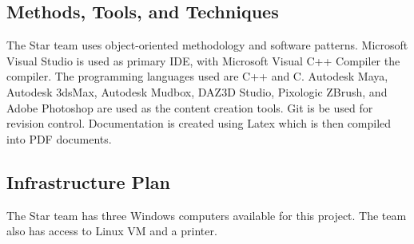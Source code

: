 \documentclass[12pt,letterpaper]{article}
\begin{document}
	\subsection[Methods, Tools, and Techniques]{Methods, Tools, and Techniques}
	The Star team uses object-oriented methodology and software patterns. Microsoft Visual Studio is used as primary IDE, with Microsoft Visual C++ Compiler the compiler. The programming languages used are C++ and C. Autodesk Maya, Autodesk 3dsMax, Autodesk Mudbox, DAZ3D Studio, Pixologic ZBrush, and Adobe Photoshop are used as the content creation tools. Git is be used for revision control. Documentation is created using Latex which is then compiled into PDF documents.

	\subsection{Infrastructure Plan}
	The Star team has three Windows computers available for this project. The team also has access to
	Linux VM and a printer.
\end{document}
